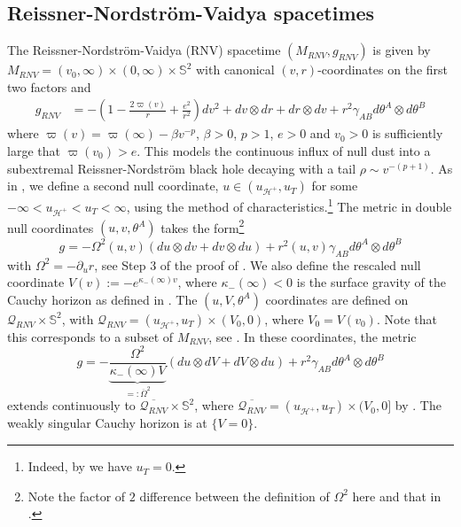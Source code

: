 \documentclass{article}
\newcommand{\Q}{\mathcal{Q}}
\newcommand{\Sp}{\mathbb{S}}
\newcommand{\rd}{\partial}
\begin{document}
\subsection{Reissner-Nordstr\"{o}m-Vaidya spacetimes}\label{RNV}
The Reissner-Nordstr\"{o}m-Vaidya (RNV) spacetime $(M_{RNV},g_{RNV})$ is given by $M_{RNV}=(v_0,\infty)\times(0,\infty)\times\Sp^2$ with canonical $(v,r)$-coordinates on the first two factors and
\begin{equation}
\begin{split}
        g_{RNV}&=-\left(1-\frac{2\varpi(v)}{r}+\frac{e^2}{r^2}\right)dv^2+dv\otimes dr+dr\otimes dv+r^2\gamma_{AB}d\theta^A\otimes d\theta^B
\end{split}
\end{equation}
where $\varpi(v)=\varpi(\infty)-\beta v^{-p}$, $\beta>0$, $p>1$, $e>0$ and $v_0>0$ is sufficiently large that $\varpi(v_0)>e$. This models the continuous influx of null dust into a subextremal Reissner-Nordstr\"{o}m black hole decaying with a tail $\rho\sim v^{-(p+1)}$.
As in \cite[Section 4.2]{Sbie22a}, we define a second null coordinate, $u\in(u_{\mathcal{H}^+},u_T)$ for some $-\infty<u_{\mathcal{H}^+}<u_T<\infty$, using the method of characteristics.\footnote{Indeed, by \cite[Proposition 4.29]{Sbie22a} we have $u_T=0$.} The metric in double null coordinates $(u,v, \theta^A)$ takes the form\footnote{Note the factor of $2$ difference between the definition of $\Omega^2$ here and that in \cite{Sbie22a}.}
\begin{equation}
    g=-\Omega^2(u,v)\left(du\otimes dv+dv\otimes du\right)+r^2(u,v)\gamma_{AB}d\theta^A\otimes d\theta^B 
\end{equation}
with $\Omega^2 = - \rd_u r$, see Step 3 of the proof of \cite[Proposition 4.25]{Sbie22a}. 
We also define the rescaled null coordinate $V(v):=-e^{\kappa_-(\infty)v}$, where $\kappa_-(\infty)<0$ is the surface gravity of the Cauchy horizon as defined in \cite{Sbie22a}. The $(u,V,\theta^A)$ coordinates are defined on $\Q_{RNV} \times \Sp^2$, with $\Q_{RNV} = (u_{\mathcal{H}^+}, u_T) \times (V_0, 0)$, where  $V_0 = V(v_0)$. Note that this corresponds to a subset of $M_{RNV}$, see \cite[Figure 10]{Sbie22a}. In these coordinates, the metric
\begin{equation}
    g=-\underbrace{\frac{\Omega^2}{\kappa_-(\infty)V}}_{=: \overline{\Omega}^2}\left(du\otimes dV+dV\otimes du\right)+r^2\gamma_{AB}d\theta^A\otimes d\theta^B
\end{equation}
extends continuously to $\overline{\Q_{RNV}} \times \Sp^2$, where $\overline{\Q_{RNV}} = (u_{\mathcal{H}^+}, u_T) \times (V_0, 0]$ by \cite[Proposition 4.25]{Sbie22a}. The weakly singular Cauchy horizon is at $\{V=0\}$. 
 
\end{document}
